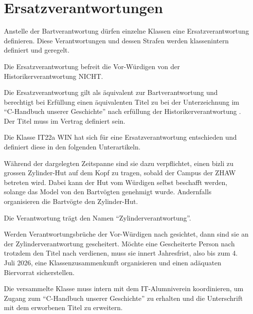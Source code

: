 \documentclass[fontsize=12pt,parskip=half]{scrartcl}
\begin{document}
\section{Ersatzverantwortungen}
\begin{contract}
  \Clause[title={Ersatzverantwortung}]\label{ersatz}
  Anstelle der Bartverantwortung dürfen einzelne Klassen eine Ersatzverantwortung definieren. Diese Verantwortungen und dessen Strafen werden klassenintern
  definiert und geregelt.

  Die Ersatzverantwortung befreit die Vor-Würdigen von der Historikerverantwortung  NICHT.

  Die Ersatzverantwortung gilt als äquivalent zur Bartverantwortung und berechtigt bei Erfüllung einen äquivalenten Titel zu  bei der Unterzeichnung
  im ``C-Handbuch unserer Geschichte'' nach erfüllung der Historikerverantwortung . Der Titel muss im Vertrag definiert sein.

  \Clause[title={Klasse IT22a WIN}]
  Die Klasse IT22a WIN hat sich für eine Ersatzverantwortung entschieden und definiert diese in den folgenden Unterartikeln.

  \SubClause[title={Ersatzverantwortung}]\label{KlasseIT22aWIN.ersatz}
  Während der  dargelegten Zeitspanne sind sie dazu verpflichtet, einen bizli zu grossen Zylinder-Hut auf dem Kopf zu tragen,
  sobald der Campus der ZHAW betreten wird. Dabei kann der Hut vom Würdigen selbst beschafft werden, solange das Model von den Bartvögten
  genehmigt wurde. Andernfalls organisieren die Bartvögte den Zylinder-Hut.

  Die Verantwortung trägt den Namen ``Zylinderverantwortung''.\label{KlasseIT22aWIN.verantwortung.name}

  \SubClause[title={Verstoss}]
  Werden Verantwortungsbrüche der Vor-Würdigen nach  gesichtet, dann sind sie an der Zylinderverantwortung
   gescheitert. Möchte eine Gescheiterte Person nach  trotzdem den Titel nach
   verdienen, muss sie innert Jahresfrist, also bis zum 4. Juli 2026, eine Klassenzusammenkunft organisieren
  und einen adäquaten Biervorrat sicherstellen.

  Die versammelte Klasse muss intern mit dem IT-Alumniverein koordinieren, um Zugang zum ``C-Handbuch unserer Geschichte'' zu erhalten und die Unterschrift
  mit dem erworbenen Titel zu erweitern.


\end{contract}
\end{document}
